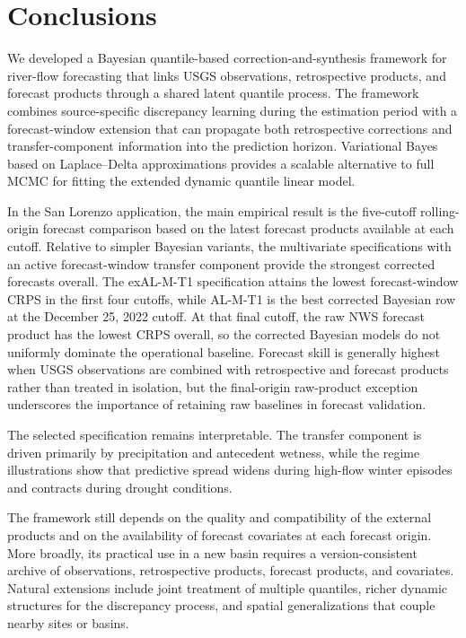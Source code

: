 \documentclass[APA,STIX1COL]{WileyNJD-v2}
\begin{document}
\section{Conclusions}
\label{sec5}

We developed a Bayesian quantile-based correction-and-synthesis framework for river-flow forecasting that links USGS observations, retrospective products, and forecast products through a shared latent quantile process. The framework combines source-specific discrepancy learning during the estimation period with a forecast-window extension that can propagate both retrospective corrections and transfer-component information into the prediction horizon. Variational Bayes based on Laplace--Delta approximations provides a scalable alternative to full MCMC for fitting the extended dynamic quantile linear model.

In the San Lorenzo application, the main empirical result is the five-cutoff rolling-origin forecast comparison based on the latest forecast products available at each cutoff. Relative to simpler Bayesian variants, the multivariate specifications with an active forecast-window transfer component provide the strongest corrected forecasts overall. The exAL-M-T1 specification attains the lowest forecast-window CRPS in the first four cutoffs, while AL-M-T1 is the best corrected Bayesian row at the December 25, 2022 cutoff. At that final cutoff, the raw NWS forecast product has the lowest CRPS overall, so the corrected Bayesian models do not uniformly dominate the operational baseline. Forecast skill is generally highest when USGS observations are combined with retrospective and forecast products rather than treated in isolation, but the final-origin raw-product exception underscores the importance of retaining raw baselines in forecast validation.

The selected specification remains interpretable. The transfer component is driven primarily by precipitation and antecedent wetness, while the regime illustrations show that predictive spread widens during high-flow winter episodes and contracts during drought conditions.

The framework still depends on the quality and compatibility of the external products and on the availability of forecast covariates at each forecast origin. More broadly, its practical use in a new basin requires a version-consistent archive of observations, retrospective products, forecast products, and covariates. Natural extensions include joint treatment of multiple quantiles, richer dynamic structures for the discrepancy process, and spatial generalizations that couple nearby sites or basins.
\end{document}
